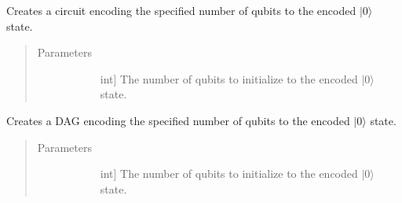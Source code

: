\documentclass[letterpaper,10pt,english]{sphinxmanual}
\begin{document}
\begin{fulllineitems}
\begin{fulllineitems}
\label{\detokenize{Steane:Steane.SteaneEncoder.createEncoderCircuit}}
\sphinxAtStartPar
Creates a circuit encoding the specified number of qubits to the encoded \(|0\rangle\) state.
\begin{quote}\begin{description}
\item[{Parameters}] \leavevmode\begin{description}
\item[{}] \leavevmode{[}int{]}
\sphinxAtStartPar
The number of qubits to initialize to the encoded \(|0\rangle\) state.

\end{description}

\end{description}\end{quote}

\end{fulllineitems}


\begin{fulllineitems}
\label{\detokenize{Steane:Steane.SteaneEncoder.createEncoderDag}}
\sphinxAtStartPar
Creates a DAG encoding the specified number of qubits to the encoded \(|0\rangle\) state.
\begin{quote}\begin{description}
\item[{Parameters}] \leavevmode\begin{description}
\item[{}] \leavevmode{[}int{]}
\sphinxAtStartPar
The number of qubits to initialize to the encoded \(|0\rangle\) state.

\end{description}

\end{description}\end{quote}

\end{fulllineitems}



\end{fulllineitems}
\end{document}
